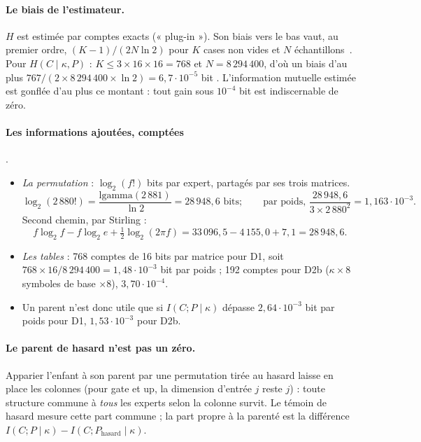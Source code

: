 \paragraph{Le biais de l'estimateur.} $H$ est estimée par comptes exacts (« plug-in »). Son biais vers le bas vaut, au premier ordre, $(K-1)/(2N\ln 2)$ pour $K$ cases non vides et $N$ échantillons~\cite{miller1955bias}. Pour $H(C\mid\kappa,P)$ : $K \le 3 \times 16 \times 16 = 768$ et $N = 8\,294\,400$, d'où un biais d'au plus $767/(2 \times 8\,294\,400 \times \ln 2) = 6{,}7\cdot10^{-5}$ bit \calc. L'information mutuelle estimée est gonflée d'au plus ce montant : tout gain sous $10^{-4}$ bit est indiscernable de zéro.

\paragraph{Les informations ajoutées, comptées} \calc.
\begin{itemize}
\item \emph{La permutation} : $\log_2(f!)$ bits par expert, partagés par ses trois matrices.
\[ \log_2(2\,880!) = \frac{\mathrm{lgamma}(2\,881)}{\ln 2} = 28\,948{,}6 \text{ bits} ; \qquad \text{par poids, } \frac{28\,948{,}6}{3 \times 2\,880^2} = 1{,}163\cdot10^{-3}. \]
Second chemin, par Stirling :
\[ f\log_2 f - f\log_2 e + \tfrac12\log_2(2\pi f) = 33\,096{,}5 - 4\,155{,}0 + 7{,}1 = 28\,948{,}6. \]
\item \emph{Les tables} : 768 comptes de 16 bits par matrice pour D1, soit $768 \times 16 / 8\,294\,400 = 1{,}48\cdot10^{-3}$ bit par poids ; 192 comptes pour D2b ($\kappa \times 8$ symboles de base $\times 8$), $3{,}70\cdot10^{-4}$.
\item Un parent n'est donc utile que si $I(C;P\mid\kappa)$ dépasse $2{,}64\cdot10^{-3}$ bit par poids pour D1, $1{,}53\cdot10^{-3}$ pour D2b.
\end{itemize}

\paragraph{Le parent de hasard n'est pas un zéro.} Apparier l'enfant à son parent par une permutation tirée au hasard laisse en place les colonnes (pour gate et up, la dimension d'entrée $j$ reste $j$) : toute structure commune à \emph{tous} les experts selon la colonne survit. Le témoin de hasard mesure cette part commune ; la part propre à la parenté est la différence $I(C;P\mid\kappa) - I(C;P_{\text{hasard}}\mid\kappa)$.

